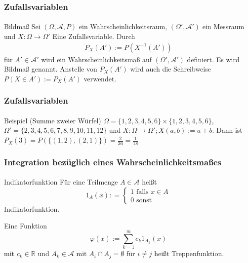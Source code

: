\documentclass{beamer}
\begin{document}
\begin{frame}
    \frametitle{Zufallsvariablen}
\framesubtitle{}
\begin{block}{Bildmaß}
Sei $(\Omega, \mathcal{A}, P)$ ein Wahrscheinlichkeitsraum, $(\Omega', \mathcal{A}')$ ein Messraum und  $X : \Omega \to \Omega'$  Eine Zufallsvariable. 
Durch 
\begin{align*}
P_X (A') := P(X^{-1} (A'))
\end{align*}
 für $A' \in \mathcal{A}'$ wird ein Wahrscheinlichkeitsmaß auf  $(\Omega', \mathcal{A}')$ definiert. Es wird Bildmaß genannt. Anstelle von $P_X (A')$ wird auch die Schreibweise $P (X \in A'):= P_X (A')$ verwendet.
\end{block}


 \end{frame}

\begin{frame}
    \frametitle{Zufallsvariablen}
\framesubtitle{}

\begin{block}{Beispiel (Summe zweier Würfel)}
$\Omega = \{1,2,3,4,5,6 \} \times \{1,2,3,4,5,6 \} $, $\Omega' = \{ 2,3,4,5,6,7,8,9,10, 11, 12\}$ und $X: \Omega \to \Omega'; X (a,b) := a +b$. Dann ist 
$P_X(3) = P(\{(1,2), (2,1)\}) = \frac{2}{36} = \frac{1}{18}$ 
\end{block}

 \end{frame}




\begin{frame}
    \frametitle{Integration bezüglich eines Wahrscheinlichkeitsmaßes}
\framesubtitle{}

\begin{block}{Indikatorfunktion}
Für eine Teilmenge $A \in \mathcal{A}$ heißt
$$ 1_A (x): = \begin{cases} 1 \text{  falls }   x \in A  \\  0  \text{  sonst}  \end{cases}$$
Indikatorfunktion.
\end{block}

\begin{block}{}
Eine Funktion 
$$ \varphi(x) := \sum_{k=1}^m c_k 1_{A_k}(x)$$ mit $c_k \in \mathbb{R}$ und $A_k \in \mathcal{A}$ mit $A_i \cap A_j = \emptyset$ für $i \neq j$
heißt Treppenfunktion.
\end{block}

 \end{frame}
\end{document}
